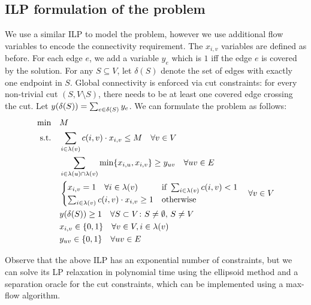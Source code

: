 \subsection{ILP formulation of the \connectivity problem}

We use a similar ILP to model the \connectivity problem, however we use additional flow variables to encode the connectivity requirement. The $x_{i, v}$ variables are defined as before. For each edge $e$, we add a variable $y_{e}$ which is $1$ iff the edge $e$ is covered by the solution. For any $S\subseteq V$, let $\delta(S)$ denote the set of edges with exactly one endpoint in $S$. Global connectivity is enforced via cut constraints: for every non-trivial cut $(S, V\setminus S)$, there needs to be at least one covered edge crossing the cut. Let $y\mathopen{}\left( \delta\mathopen{}\left( S \right) \right)=\sum_{e \in \delta(S)} y_e$. We can formulate the \connectivity problem as follows:
\begin{align}
    \text{min} \quad & M \nonumber\\
    \text{s.t.} \quad & \sum_{i\in\lambda\mathopen{}\left( v \right)}c\mathopen{}\left( i, v \right) \cdot x_{i, v} \leq M \quad \forall v\in V \label{eqt:4}\\
    & \sum_{i\in\lambda\mathopen{}\left( u \right)\cap\lambda\mathopen{}\left( v \right)}\min\mathopen{}\left\{ x_{i, u}, x_{i, v} \right\} \geq y_{uv} \quad \forall uv\in E\\
    &\begin{cases}
            x_{i, v} = 1 \quad \forall i\in\lambda\mathopen{}\left( v \right) & \text{if } \sum_{i\in \lambda\mathopen{}\left( v \right)} c\mathopen{}\left( i, v \right) < 1\\
            \sum_{i\in \lambda\mathopen{}\left( v \right)} c\mathopen{}\left( i, v \right)\cdot x_{i, v} \geq 1 & \text{otherwise}
    \end{cases} \quad \forall v\in V \label{eqt:5}\\
    & y\mathopen{}\left( \delta\mathopen{}\left( S \right) \right)\geq 1 \quad \forall S\subset V\colon S\neq\emptyset,\, S\neq V \label{eqt:6}\\
    & x_{i, v}  \in \{0, 1\} \quad \forall v\in V, i\in\lambda\mathopen{}\left( v \right) \nonumber\\
    & y_{uv} \in \{0, 1\} \quad \forall uv\in E \label{eqt:integrality_connectivity}
\end{align}

Observe that the above ILP has an exponential number of constraints, but we can solve its LP relaxation in polynomial time using the ellipsoid method and a separation oracle for the cut constraints, which can be implemented using a max-flow algorithm.

